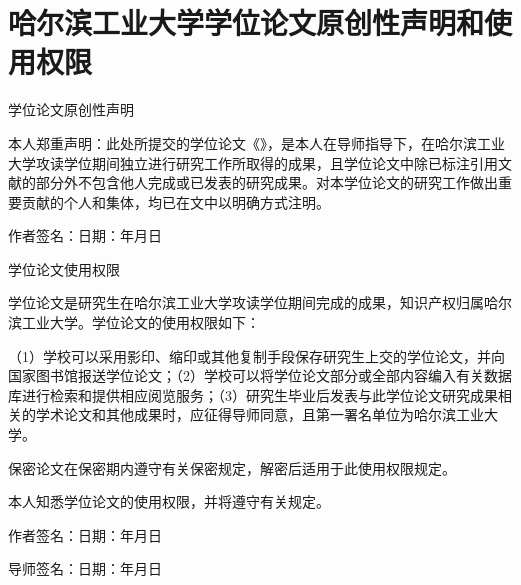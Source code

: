 \chapter*{哈尔滨工业大学学位论文原创性声明和使用权限}
{}

\vspace{\baselineskip}
\begin{center}{\xiaosan \heiti 学位论文原创性声明}\end{center}
\vspace{1em}

本人郑重声明：此处所提交的学位论文《\ctitle》，是本人在导师指导下，在哈尔滨工业大学攻读学位期间独立进行研究工作所取得的成果，且学位论文中除已标注引用文献的部分外不包含他人完成或已发表的研究成果。对本学位论文的研究工作做出重要贡献的个人和集体，均已在文中以明确方式注明。

\vspace{\baselineskip}
\hspace{6em}作者签名：\hfill 日期：\hspace{2.5em}年\hspace{1.5em}月\hspace{1.5em}日

\vspace{2\baselineskip}
\begin{center}{\xiaosan \heiti 学位论文使用权限}\end{center}
\vspace{1em}

学位论文是研究生在哈尔滨工业大学攻读学位期间完成的成果，知识产权归属哈尔滨工业大学。学位论文的使用权限如下：

（1）学校可以采用影印、缩印或其他复制手段保存研究生上交的学位论文，并向国家图书馆报送学位论文；（2）学校可以将学位论文部分或全部内容编入有关数据库进行检索和提供相应阅览服务；（3）研究生毕业后发表与此学位论文研究成果相关的学术论文和其他成果时，应征得导师同意，且第一署名单位为哈尔滨工业大学。

保密论文在保密期内遵守有关保密规定，解密后适用于此使用权限规定。

本人知悉学位论文的使用权限，并将遵守有关规定。


\vspace{2\baselineskip}
\hspace{6em}作者签名：\hfill 日期：\hspace{2.5em}年\hspace{1.5em}月\hspace{1.5em}日

\vspace{2\baselineskip}
\hspace{6em}导师签名：\hfill 日期：\hspace{2.5em}年\hspace{1.5em}月\hspace{1.5em}日

